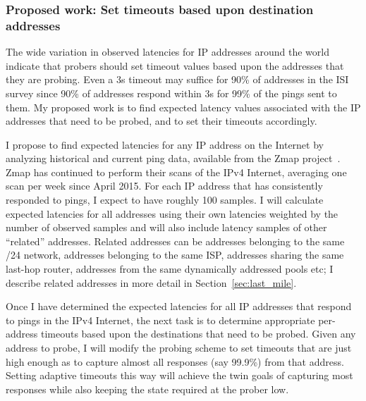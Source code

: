 

\subsubsection{Proposed work: Set timeouts based upon
  destination addresses}

The wide variation in observed latencies for IP addresses around the
world indicate that probers should set timeout values
based upon the addresses that they are probing. Even a 3s
timeout may suffice for 90\% of addresses in the ISI survey since 90\% of addresses respond
within 3s for 99\% of the pings sent to them. My proposed work is to find expected latency values
associated with the IP addresses that need to be probed, and to set
their timeouts accordingly.
 
I propose to find expected latencies for any IP address on the
Internet by analyzing historical and current ping data, available from
the Zmap project~\cite{censys-icmp}. Zmap has continued to perform
their scans of the IPv4 Internet, averaging one scan per week since
April 2015. For each IP address that has consistently responded to
pings, I expect to have roughly 100 samples. I will calculate expected
latencies for all addresses using their own latencies weighted by the
number of observed samples and will also include latency samples of
other ``related'' addresses. Related addresses can be addresses
belonging to the same /24 network, addresses belonging to the same
ISP, addresses sharing the same last-hop router, addresses from the
same dynamically addressed pools etc; I describe related addresses in
more detail in Section~\ref{sec:last_mile}.

Once I have determined the expected latencies for all IP addresses
that respond to pings in the IPv4 Internet, the next task is to
determine appropriate per-address timeouts based upon the destinations
that need to be probed. Given any address to probe, I will modify the probing scheme to
set timeouts that are just high enough as to capture almost all
responses (say 99.9\%) from that address. Setting adaptive timeouts this way will achieve the
twin goals of capturing most responses while also keeping the state
required at the prober low.